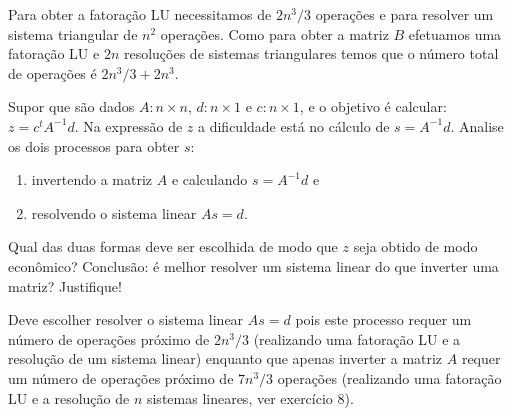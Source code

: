 \documentclass[a4paper,12pt, leqno, answers]{exam}
\begin{document}
\begin{questions}
\begin{solution}
        Para obter a fatora\c{c}\~{a}o LU necessitamos de $2 n^3 / 3$ opera\c{c}\~{o}es e para resolver um sistema triangular de $n^2$ opera\c{c}\~{o}es. Como para obter a matriz $B$ efetuamos uma fatora\c{c}\~{a}o LU e $2 n$ resolu\c{c}\~{o}es de sistemas triangulares temos que o n\'{u}mero total de opera\c{c}\~{o}es \'{e} $2 n^3 / 3 + 2 n^3$.
    \end{solution}

    \question Supor que s\~{a}o dados $A : n \times n$, $d: n \times 1$ e $c : n \times 1$, e o objetivo \'{e} calcular: $z = c^t A^{-1} d$. Na express\~{a}o de $z$ a dificuldade est\'{a} no c\'{a}lculo de $s = A^{-1} d$. Analise os dois processos para obter $s$:
    \begin{enumerate}
        \item invertendo a matriz $A$ e calculando $s = A^{-1} d$ e
        \item resolvendo o sistema linear $A s = d$.
    \end{enumerate}
    Qual das duas formas deve ser escolhida de modo que $z$ seja obtido de modo econômico? Conclus\~{a}o: \'{e} melhor resolver um sistema linear do que inverter uma matriz? Justifique!
    \begin{solution}
        Deve escolher resolver o sistema linear $A s = d$ pois este processo requer um n\'{u}mero de opera\c{c}\~{o}es pr\'{o}ximo de $2 n^3 / 3$ (realizando uma fatora\c{c}\~{a}o LU e a resolu\c{c}\~{a}o de um sistema linear) enquanto que apenas inverter a matriz $A$ requer um n\'{u}mero de opera\c{c}\~{o}es pr\'{o}ximo de $7 n^3 / 3$ opera\c{c}\~{o}es (realizando uma fatora\c{c}\~{a}o LU e a resolu\c{c}\~{a}o de $n$ sistemas lineares, ver exerc\'{i}cio 8).
    \end{solution}


\end{questions}
\end{document}
